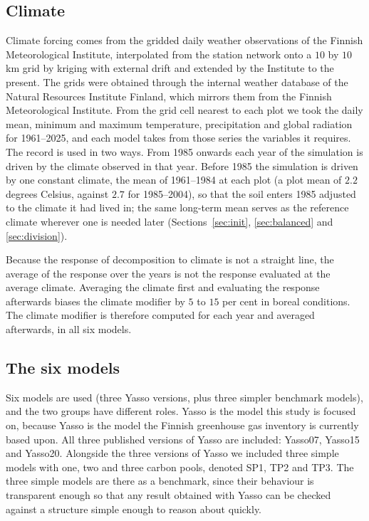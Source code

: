 \documentclass[11pt]{article}
\begin{document}
\subsection{Climate}\label{sec:climate}

Climate forcing comes from the gridded daily weather observations of the Finnish
Meteorological Institute, interpolated from the station network onto a $10$ by $10$ km grid
by kriging with external drift \citep{Aalto2016} and extended by the Institute to the
present. The grids were obtained through the internal weather database of the Natural
Resources Institute Finland, which mirrors them from the Finnish Meteorological Institute.
From the grid cell nearest to each plot we took the daily mean, minimum and maximum
temperature, precipitation and global radiation for 1961--2025, and each model takes from
those series the variables it requires.
The record is used in two ways. From 1985 onwards each year of the simulation is driven by
the climate observed in that year. Before 1985 the simulation is driven by one constant
climate, the mean of 1961--1984 at each plot (a plot mean of $2.2$ degrees Celsius, against
$2.7$ for 1985--2004), so that the soil enters 1985 adjusted to the climate it had lived in;
the same long-term mean serves as the reference climate wherever one is needed later
(Sections~\ref{sec:init}, \ref{sec:balanced} and \ref{sec:division}).

Because the response of decomposition to climate is not a straight line, the average of the
response over the years is not the response evaluated at the average climate. Averaging the
climate first and evaluating the response afterwards biases the climate modifier by $5$ to
$15$ per cent in boreal conditions. The climate modifier is therefore computed for each year
and averaged afterwards, in all six models.

\subsection{The six models}\label{sec:models}

Six models are used (three Yasso versions, plus three simpler benchmark models), and the two groups have different roles.
Yasso is the model this study is
focused on, because Yasso is the model the Finnish greenhouse gas inventory is currently based upon. All three
published versions of Yasso are included: Yasso07, Yasso15 and Yasso20. Alongside the three
versions of Yasso we included three simple models with one, two and three carbon pools,
denoted SP1, TP2 and TP3. The three simple models are there as a benchmark, since their
behaviour is transparent enough so that any result obtained with Yasso can be checked against
a structure simple enough to reason about quickly.
\end{document}
